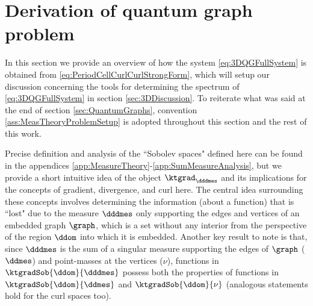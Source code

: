 \section{Derivation of quantum graph problem} \label{sec:3DSystemDerivation}


In this section we provide an overview of how the system \eqref{eq:3DQGFullSystem} is obtained from \eqref{eq:PeriodCellCurlCurlStrongForm}, which will setup our discussion concerning the tools for determining the spectrum of \eqref{eq:3DQGFullSystem} in section \ref{sec:3DDiscussion}.
To reiterate what was said at the end of section \ref{sec:QuantumGraphs}, convention \ref{ass:MeasTheoryProblemSetup} is adopted throughout this section and the rest of this work. 

Precise definition and analysis of the ``Sobolev spaces" defined here can be found in the appendices \ref{app:MeasureTheory}-\ref{app:SumMeasureAnalysis}, but we provide a short intuitive idea of the object $\ktgrad_{\dddmes}$ and its implications for the concepts of gradient, divergence, and curl here.
The central idea surrounding these concepts involves determining the information (about a function) that is ``lost" due to the measure $\dddmes$ only supporting the edges and vertices of an embedded graph $\graph$, which is a set without any interior from the perspective of the region $\ddom$ into which it is embedded.
Another key result to note is that, since $\dddmes$ is the sum of a singular measure supporting the edges of $\graph$ ($\ddmes$) and point-masses at the vertices ($\nu$), functions in $\ktgradSob{\ddom}{\dddmes}$ possess both the properties of functions in $\ktgradSob{\ddom}{\ddmes}$ and $\ktgradSob{\ddom}{\nu}$ (analogous statements hold for the curl spaces too).

